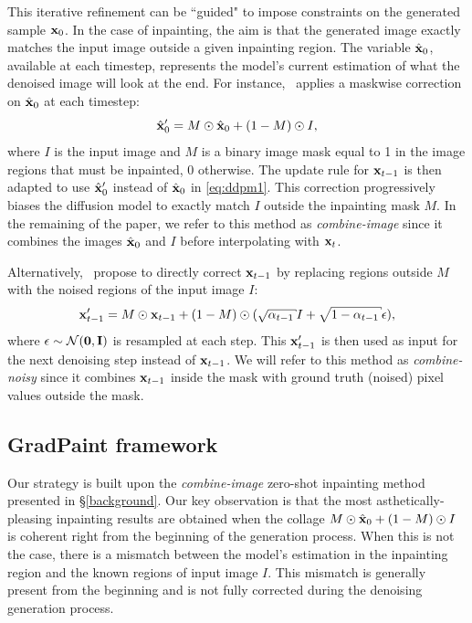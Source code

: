 This iterative refinement can be ``guided" to impose constraints on the generated sample $\mathbf{x}_0$. In the case of inpainting, 
the aim is that the generated image exactly matches the input image outside a given inpainting region. The variable $\hat{\mathbf{x}}_0$, 
available at each timestep, represents the model's current estimation of what the denoised image will look at the end. 
For instance,~\cite{nichol2021glide} applies a maskwise correction on $\hat{\mathbf{x}}_0$ at each timestep:
\begin{equation}
\hat{\mathbf{x}}_0' = M \odot \hat{\mathbf{x}}_0 + (1 - M) \odot I,
\end{equation}
where $I$ is the input image and $M$ is a binary image mask equal to 1 in the image regions that must be inpainted, 0 otherwise. 
The update rule for $\mathbf{x}_{t-1}$ is then adapted to use $\hat{\mathbf{x}}_0'$ instead of $\hat{\mathbf{x}}_0$ in \autoref{eq:ddpm1}. This correction 
progressively biases the diffusion model to exactly match $I$ outside the inpainting mask $M$. In the remaining of the paper, 
we refer to this method as \textit{combine-image} since it combines the images $\hat{\mathbf{x}}_0$ and $I$ before interpolating with $\mathbf{x}_t$.

Alternatively,~\cite{song2021scorebased, rombach2022high, lugmayr2022repaint} propose to directly correct $\mathbf{x}_{t-1}$ by replacing 
regions outside $M$ with the noised regions of the input image $I$:
\begin{equation}
\x_{t-1}' = M \odot \x_{t-1} + (1-M) \odot (\sqrt{\alpha_{t-1}} I +  \sqrt{1 - \alpha_{t-1}} \epsilon),
\end{equation}
where $\epsilon \sim \mathcal{N}(\mathbf{0}, \mathbf{I})$ is resampled at each step. This $\mathbf{x}_{t-1}'$ is then used as input for the next denoising step 
instead of $\mathbf{x}_{t-1}$. We will refer to this method as \textit{combine-noisy} since it combines $\mathbf{x}_{t-1}$ inside the mask with 
ground truth (noised) pixel values outside the mask.


\subsection{GradPaint framework}


Our strategy is built upon the \textit{combine-image} zero-shot inpainting method presented in \S\ref{background}.
 Our key observation is that the most asthetically-pleasing inpainting results are obtained when the 
 collage $M \odot \hat{\mathbf{x}}_0 + (1-M) \odot I$ is coherent right from the beginning of the generation process.
  When this is not the case, there is a mismatch between the model's estimation in the inpainting region and 
  the known regions of input image $I$. This mismatch is generally present from the beginning and is not fully 
  corrected during the denoising generation process. 

